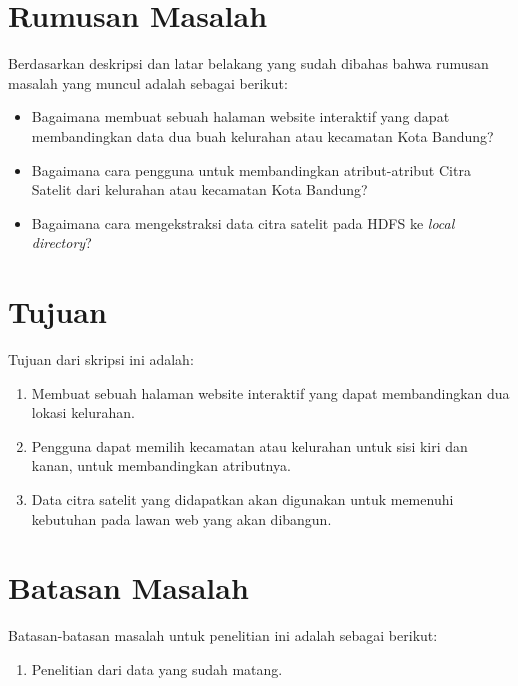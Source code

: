 \section{Rumusan Masalah}
\label{sec:rumusan}
Berdasarkan deskripsi dan latar belakang yang sudah dibahas bahwa rumusan masalah yang muncul adalah sebagai berikut:

\begin{itemize}
	\item Bagaimana membuat sebuah halaman website interaktif yang dapat membandingkan data dua buah kelurahan atau kecamatan Kota Bandung?
	\item Bagaimana cara pengguna untuk membandingkan atribut-atribut Citra Satelit dari kelurahan atau kecamatan Kota Bandung?
	\item Bagaimana cara mengekstraksi data citra satelit pada HDFS ke \textit{local directory}?	
\end{itemize}

\section{Tujuan}
\label{sec:tujuan}
Tujuan dari skripsi ini adalah:
\begin{enumerate}
	\item Membuat sebuah halaman website interaktif yang dapat membandingkan dua lokasi kelurahan.
	\item Pengguna dapat memilih kecamatan atau kelurahan untuk sisi kiri dan kanan, untuk membandingkan atributnya.
	\item Data citra satelit yang didapatkan akan digunakan untuk memenuhi kebutuhan pada lawan web yang akan dibangun.
\end{enumerate}


\section{Batasan Masalah}
\label{sec:batasan}

Batasan-batasan masalah untuk penelitian ini adalah sebagai berikut:
\begin{enumerate}
	\item Penelitian dari data yang sudah matang.
\end{enumerate}

